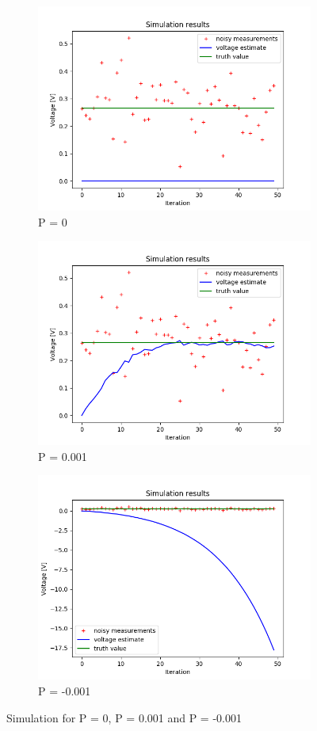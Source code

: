 \documentclass{article}
\begin{document}
    \begin{figure}[H]
        \begin{subfigure} {.3\textwidth}  
            \centering 
            \includegraphics[width=0.7\linewidth]{./img/P0_.png}
            \caption{P = 0 }
        \end{subfigure}
        \begin{subfigure}{.3\textwidth}            
            \centering
            \includegraphics[width=0.7\linewidth]{./img/P001_.png}
            \caption{P = 0.001}
        \end{subfigure}    
        \begin{subfigure} {.3\textwidth}         
            \centering
            \includegraphics[width=0.7\linewidth]{./img/Pneg.png}
            \caption{P = -0.001}
        \end{subfigure}
        \caption{Simulation for P = 0, P =  0.001 and P = -0.001}
        \label{fig:simulation7}
    \end{figure}
\end{document}
